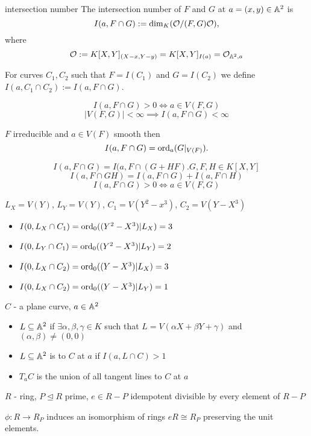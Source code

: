\documentclass[twoside, a4paper, 12pt]{book}
\begin{document}
\begin{definition}{intersection number}{}
  The intersection number of $F$ and $G$ at $a=(x,y)\in \mathbb{A}^2$ is
  $$I(a, F\cap G):=\dim_K(\mathcal{O}/(F,G)\mathcal{O}),$$
  where 
  $$\mathcal{O}:=K[X,Y]_{(X-x, Y-y)}=K[X,Y]_{I(a)}=\mathcal{O}_{\mathbb{A}^2,a}$$

  For curves $C_1, C_2$ such that $F=I(C_1)$ and $G=I(C_2)$ we define $I(a, C_1\cap C_2):=I(a, F\cap G)$.
\end{definition}

$$I(a, F\cap G)>0\iff a\in V(F,G)$$
$$|V(F,G)|<\infty\implies I(a, F\cap G)<\infty$$
\begin{center}
  $F$ irreducible and $a\in V(F)$ smooth then 
  $$I(a, F\cap G)=\operatorname{ord}_a(G|_{V(F)}).$$
\end{center}

$$I(a, F\cap G)=I(a, F\cap (G+HF). G,F,H\in K[X,Y]$$
$$I(a, F\cap GH)=I(a, F\cap G)+I(a, F\cap H)$$
$$I(a, F\cap G)>0\iff a\in V(F, G)$$


$L_X=V(Y)$, $L_Y=V(Y)$, $C_1=V(Y^2-x^3)$, $C_2=V(Y-X^3)$
\begin{itemize}
  \item $I(0, L_X\cap C_1)=\operatorname{ord}_0((Y^2-X^3)|L_X)=3$
  \item $I(0, L_Y\cap C_1)=\operatorname{ord}_0((Y^2-X^3)|L_Y)=2$
  \item $I(0, L_X\cap C_2)=\operatorname{ord}_0((Y-X^3)|L_X)=3$
  \item $I(0, L_X\cap C_2)=\operatorname{ord}_0((Y-X^3)|L_Y)=1$
\end{itemize}

\begin{definition}{}{}
  $C$ - a plane curve, $a\in\mathbb{A}^2$

  \begin{itemize}
    \item $L\subseteq \mathbb{A}^2$  if $\exists \alpha, \beta, \gamma\in K$ such that $L=V(\alpha X+\beta Y+\gamma)$ and $(\alpha, \beta)\neq(0,0)$
    \item $L\subseteq\mathbb{A}^2$ is  to $C$ at $a$ if $I(a, L\cap C)>1$
    \item $T_aC$ is the union of all tangent lines to $C$ at $a$
  \end{itemize}
\end{definition}

\begin{lemma}{}{}
  $R$ - ring, $P\trianglelefteq R$ prime, $e\in R-P$ idempotent divisible by every element of $R-P$

  $\phi: R\to R_P$ induces an isomorphism of rings $eR\cong R_P$ preserving the unit elements.
\end{lemma}
\end{document}
